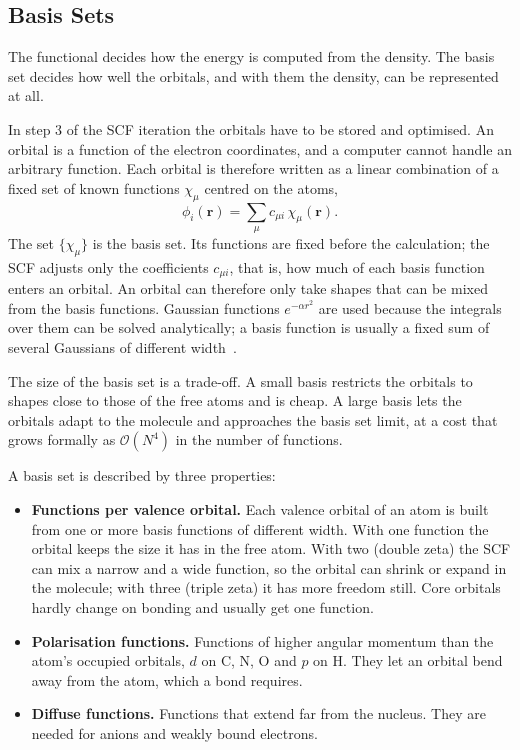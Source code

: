 \subsection{Basis Sets}
\label{sec:background-basis}

The functional decides how the energy is computed from the density. The
basis set decides how well the orbitals, and with them the density, can be
represented at all.

In step 3 of the SCF iteration the orbitals have to be stored and
optimised. An orbital is a function of the electron coordinates, and a
computer cannot handle an arbitrary function. Each orbital is therefore
written as a linear combination of a fixed set of known functions
$\chi_\mu$ centred on the atoms,
%
\begin{equation}
  \phi_i(\mathbf{r}) = \sum_\mu c_{\mu i}\, \chi_\mu(\mathbf{r}) .
\end{equation}
%
The set $\{\chi_\mu\}$ is the basis set. Its functions are fixed before the
calculation; the SCF adjusts only the coefficients $c_{\mu i}$, that is,
how much of each basis function enters an orbital. An orbital can therefore
only take shapes that can be mixed from the basis functions. Gaussian
functions $e^{-\alpha r^2}$ are used because the integrals over them can be
solved analytically; a basis function is usually a fixed sum of several
Gaussians of different width~\cite{jensen2017}.

The size of the basis set is a trade-off. A small basis restricts the
orbitals to shapes close to those of the free atoms and is cheap. A large
basis lets the orbitals adapt to the molecule and approaches the basis set
limit, at a cost that grows formally as $\mathcal{O}(N^4)$ in the number of
functions.

A basis set is described by three properties:

\begin{itemize}
  \item \textbf{Functions per valence orbital.} Each valence orbital of
    an atom is built from one or more basis functions of different
    width. With one function the orbital keeps the size it has in the
    free atom. With two (double zeta) the SCF can mix a narrow and a
    wide function, so the orbital can shrink or expand in the molecule;
    with three (triple zeta) it has more freedom still. Core orbitals
    hardly change on bonding and usually get one function.
  \item \textbf{Polarisation functions.} Functions of higher angular
    momentum than the atom's occupied orbitals, $d$ on C, N, O and $p$ on
    H. They let an orbital bend away from the atom, which a bond requires.
  \item \textbf{Diffuse functions.} Functions that extend far from the
    nucleus. They are needed for anions and weakly bound electrons.
\end{itemize}

